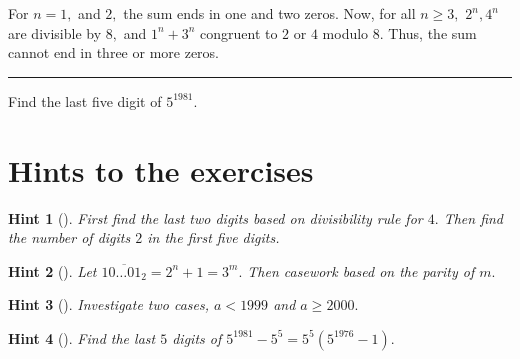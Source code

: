 \documentclass{article}
\newtheorem{hint}{Hint}
\begin{document}
\begin{soln}
    For $n=1,$ and $2,$ the sum ends in one and two zeros.
    Now, for all $n \ge 3,$ $2^n, 4^n$ are divisible by $8,$
    and $1^n + 3^n$ congruent to $2$ or $4$ modulo $8$.
    Thus, the sum cannot end in three or more zeros.
\end{soln}

\bigbreak

\noindent\rule{16.5cm}{0.4pt}

\begin{exercise*}[Twelf]
    \label{exercise:twelf}
    Find the last five digit of $5^{1981}.$
\end{exercise*}

\section{Hints to the exercises}

\begin{hint}[]
    First find the last two digits based on divisibility rule for $4.$
    Then find the number of digits $2$ in the first five digits.
\end{hint}

\begin{hint}[]
    Let $\overline{10\ldots01_2} = 2^n + 1 = 3^m.$ Then casework based on the parity of $m.$
\end{hint}

\begin{hint}[]
    Investigate two cases, $a < 1999$ and $a \ge 2000.$
\end{hint}

\begin{hint}[]
    Find the last $5$ digits of $5^{1981} - 5^5 = 5^5(5^{1976}-1).$
\end{hint}
\end{document}
